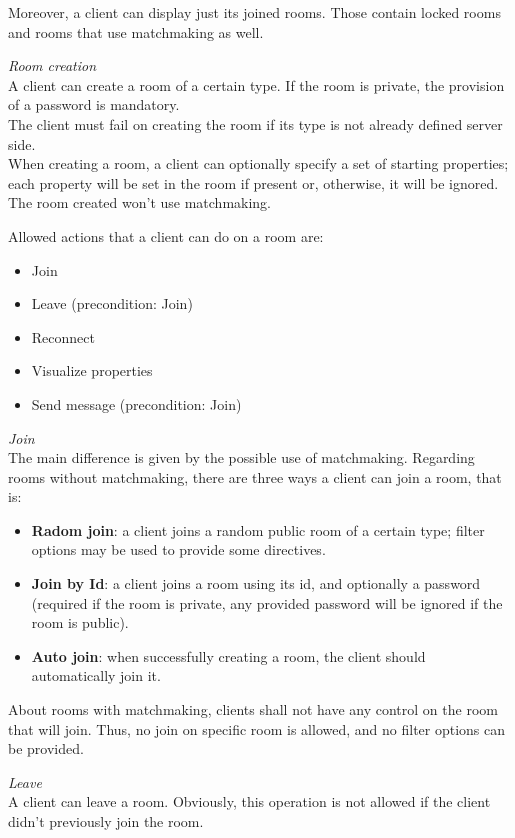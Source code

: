 Moreover, a client can display just its joined rooms. Those contain locked rooms and rooms that use matchmaking as well. 

\bigskip
\textit{Room creation}
\\
A client can create a room of a certain type. If the room is private, the provision of a password is mandatory.
\\
The client must fail on creating the room if its type is not already defined server side.
\\
When creating a room, a client can optionally specify a set of starting properties; each property will be set in the room if present or, otherwise, it will be ignored.
\\
The room created won't use matchmaking.

\bigskip
Allowed actions that a client can do on a room are:
\begin{itemize}
\item Join
\item Leave (precondition: Join)
\item Reconnect
\item Visualize properties
\item Send message (precondition: Join)
\end{itemize}

\bigskip
\textit{Join}
\\
The main difference is given by the possible use of matchmaking.
Regarding rooms without matchmaking, there are three ways a client can join a room, that is:
\begin{itemize}
\item \textbf{Radom join}: a client joins a random public room of a certain type; filter options may be used to provide some directives.
\item \textbf{Join by Id}: a client joins a room using its id, and optionally a password (required if the room is private, any provided password will be ignored if the room is public).
\item \textbf{Auto join}: when successfully creating a room, the client should automatically join it.
\end{itemize} 

About rooms with matchmaking, clients shall not have any control on the room that will join. Thus, no join on specific room is allowed, and no filter options can be provided. 

\bigskip
\textit{Leave}
\\
A client can leave a room. Obviously, this operation is not allowed if the client didn't previously join the room. 


